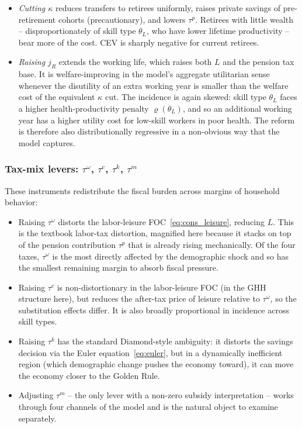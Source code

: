 \documentclass[12pt,a4paper]{article}
\begin{document}
\begin{itemize}
\item \emph{Cutting $\kappa$} reduces transfers to retirees uniformly, raises private savings of pre-retirement cohorts (precautionary), and lowers $\tau^p$. Retirees with little wealth -- disproportionately of skill type $\theta_L$, who have lower lifetime productivity -- bear more of the cost. CEV is sharply negative for current retirees.
\item \emph{Raising $j_R$} extends the working life, which raises both $L$ and the pension tax base. It is welfare-improving in the model's aggregate utilitarian sense whenever the disutility of an extra working year is smaller than the welfare cost of the equivalent $\kappa$ cut. The incidence is again skewed: skill type $\theta_L$ faces a higher health-productivity penalty $\varrho(\theta_L)$, and so an additional working year has a higher utility cost for low-skill workers in poor health. The reform is therefore also distributionally regressive in a non-obvious way that the model captures.
\end{itemize}
 
\subsubsection{Tax-mix levers: $\tau^\omega$, $\tau^c$, $\tau^k$, $\tau^m$}
 
These instruments redistribute the fiscal burden across margins of household behavior:
 
\begin{itemize}
\item Raising $\tau^\omega$ distorts the labor-leisure FOC~\eqref{eq:cons_leisure}, reducing $L$. This is the textbook labor-tax distortion, magnified here because it stacks on top of the pension contribution $\tau^p$ that is already rising mechanically. Of the four taxes, $\tau^\omega$ is the most directly affected by the demographic shock and so has the smallest remaining margin to absorb fiscal pressure.
\item Raising $\tau^c$ is non-distortionary in the labor-leisure FOC (in the GHH structure here), but reduces the after-tax price of leisure relative to $\tau^\omega$, so the substitution effects differ. It is also broadly proportional in incidence across skill types.
\item Raising $\tau^k$ has the standard Diamond-style ambiguity: it distorts the savings decision via the Euler equation~\eqref{eq:euler}, but in a dynamically inefficient region (which demographic change pushes the economy toward), it can move the economy closer to the Golden Rule.
\item Adjusting $\tau^m$ -- the only lever with a non-zero subsidy interpretation -- works through four channels of the model and is the natural object to examine separately.
\end{itemize}
 
\end{document}
